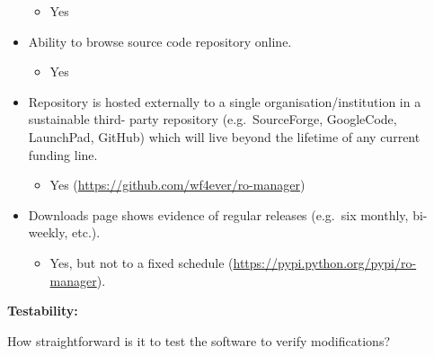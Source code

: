 \begin{itemize}
  \begin{itemize}
  \itemsep1pt\parskip0pt
  \item
    Yes
  \end{itemize}
\item
  Ability to browse source code repository online.

  \begin{itemize}
  \itemsep1pt\parskip0pt
  \item
    Yes
  \end{itemize}
\item
  Repository is hosted externally to a single organisation/institution
  in a sustainable third- party repository (e.g.~SourceForge,
  GoogleCode, LaunchPad, GitHub) which will live beyond the lifetime of
  any current funding line.

  \begin{itemize}
  \itemsep1pt\parskip0pt
  \item
    Yes (\url{https://github.com/wf4ever/ro-manager})
  \end{itemize}
\item
  Downloads page shows evidence of regular releases (e.g.~six monthly,
  bi-weekly, etc.).

  \begin{itemize}
  \itemsep1pt\parskip0pt
  \item
    Yes, but not to a fixed schedule
    (\url{https://pypi.python.org/pypi/ro-manager}).
  \end{itemize}
\end{itemize}

\textbf{Testability:}

How straightforward is it to test the software to verify modifications?

